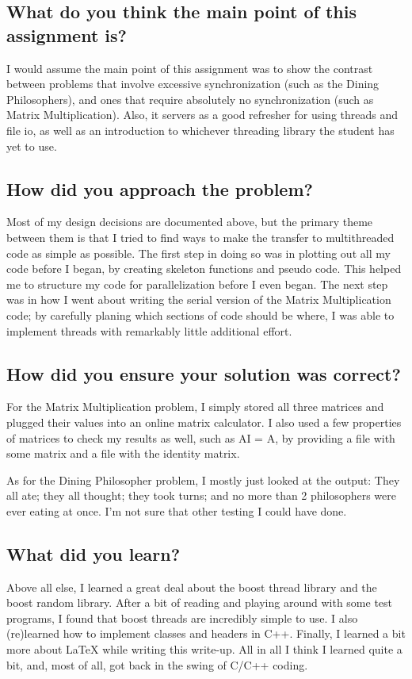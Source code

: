 \documentclass[letterpaper,10pt,titlepage]{article}
\begin{document}
\subsection{What do you think the main point of this assignment is?}
I would assume the main point of this assignment was to show the contrast
between problems that involve excessive synchronization (such as the Dining Philosophers),
and ones that require absolutely no synchronization (such as Matrix Multiplication).
Also, it servers as a good refresher for using threads and file io, as well as an introduction
to whichever threading library the student has yet to use.

\vfill\break

\subsection{How did you approach the problem?}
Most of my design decisions are documented above, but the primary theme between
them is that I tried to find ways to make the transfer to multithreaded code as simple 
as possible. The first step in doing so was in plotting out all my code before I began, 
by creating skeleton functions and pseudo code. This helped me to structure my code for
parallelization before I even began. The next step was in how I went about writing the
serial version of the Matrix Multiplication code; by carefully planing which sections
of code should be where, I was able to implement threads with remarkably little additional
effort.


\subsection{How did you ensure your solution was correct?}
For the Matrix Multiplication problem, I simply stored all three matrices and
plugged their values into an online matrix calculator. I also used a few properties
of matrices to check my results as well, such as AI = A, by providing a file with
some matrix and a file with the identity matrix.

As for the Dining Philosopher problem, I mostly just looked at the output: They all ate;
they all thought; they took turns; and no more than 2 philosophers were ever eating at once.
I'm not sure that other testing I could have done.
 
\subsection{What did you learn?}
Above all else, I learned a great deal about the boost thread library and the boost random library.
After a bit of reading and playing around with some test programs, I found that boost threads are 
incredibly simple to use. I also (re)learned how to implement classes and headers in C++.
Finally, I learned a bit more about LaTeX while writing this write-up. All in all I think I
learned quite a bit, and, most of all, got back in the swing of C/C++ coding.

\vfill\break


\fancyhead{}
\end{document}
